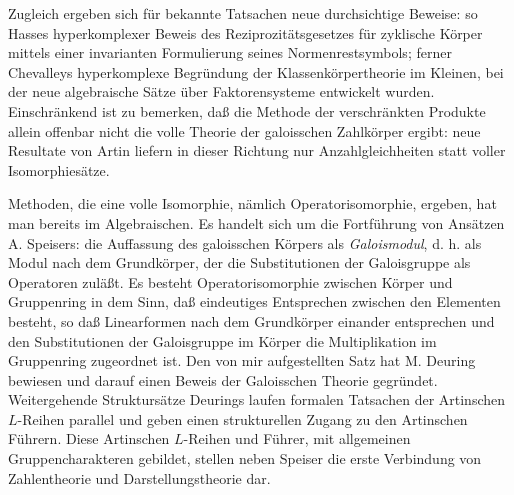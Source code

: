\documentclass[11pt]{article}
\begin{document}
Zugleich ergeben sich für bekannte Tatsachen neue durchsichtige Beweise: so Hasses hyperkomplexer Beweis des Reziprozitätsgesetzes für zyklische Körper mittels einer invarianten Formulierung seines Normenrestsymbols; ferner Chevalleys hyperkomplexe Begründung der Klassenkörpertheorie im Kleinen, bei der neue algebraische Sätze über Faktorensysteme entwickelt wurden. Einschränkend ist zu bemerken, daß die Methode der verschränkten Produkte allein offenbar nicht die volle Theorie der galoisschen Zahlkörper ergibt: neue Resultate von Artin liefern in dieser Richtung nur Anzahlgleichheiten statt voller Isomorphiesätze.

Methoden, die eine volle Isomorphie, nämlich Operatorisomorphie, ergeben, hat man bereits im Algebraischen. Es handelt sich um die Fortführung von Ansätzen A. Speisers: die Auffassung des galoisschen Körpers als \emph{Galoismodul}, d. h. als Modul nach dem Grundkörper, der die Substitutionen der Galoisgruppe als Operatoren zuläßt. Es besteht Operatorisomorphie zwischen Körper und Gruppenring in dem Sinn, daß eindeutiges Entsprechen zwischen den Elementen besteht, so daß Linearformen nach dem Grundkörper einander entsprechen und den Substitutionen der Galoisgruppe im Körper die Multiplikation im Gruppenring zugeordnet ist. Den von mir aufgestellten Satz hat M. Deuring bewiesen und darauf einen Beweis der Galoisschen Theorie gegründet. Weitergehende Struktursätze Deurings laufen formalen Tatsachen der Artinschen \(L\)-Reihen parallel und geben einen strukturellen Zugang zu den Artinschen Führern. Diese Artinschen \(L\)-Reihen und Führer, mit allgemeinen Gruppencharakteren gebildet, stellen neben Speiser die erste Verbindung von Zahlentheorie und Darstellungstheorie dar.
\end{document}
